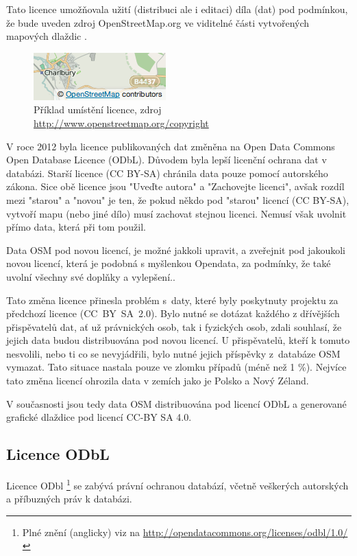 Tato licence umožňovala užití (distribuci ale i editaci) díla (dat) pod podmínkou,
že bude uveden zdroj OpenStreetMap.org ve viditelné části
vytvořených mapových dlaždic \cite{OSMlicence}.

  \begin{figure}[hbt]
    \centering
      \includegraphics[scale=0.75]{./pictures/attribution_example.png}
      \caption{Příklad umístění licence,
                zdroj \url{http://www.openstreetmap.org/copyright}}
      \label{fig:attribution_example}
  \end{figure} 

V roce 2012 byla licence publikovaných dat změněna na Open Data Commons
Open Database Licence (ODbL).
Důvodem byla lepší licenční ochrana dat v databázi. 
Starší licence (CC BY-SA) chránila data pouze pomocí autorského zákona. 
Sice obě licence jsou "Uveďte autora" a "Zachovejte licenci", avšak rozdíl mezi
"starou" a "novou" je ten, že pokud někdo pod "starou" licencí (CC BY-SA),
vytvoří mapu (nebo jiné dílo) musí zachovat stejnou licenci.
Nemusí však uvolnit přímo data, která při tom použil.

Data OSM pod novou licencí, je možné jakkoli upravit,
a zveřejnit pod jakoukoli novou licencí,
která je podobná s myšlenkou Opendata, 
za podmínky, že také uvolní všechny své doplňky a vylepšení.\cite{OSMlicenceChange}.

Tato změna licence přinesla problém
s~daty, které byly poskytnuty projektu za předchozí licence
(CC~BY~SA~2.0). Bylo nutné se dotázat každého z dřívějších
přispěvatelů dat, ať už právnických osob, tak i fyzických osob,
zdali souhlasí, že jejich data budou distribuována pod novou licencí.
U přispěvatelů, kteří k tomuto nesvolili, nebo ti co se nevyjádřili,
bylo nutné jejich příspěvky z~databáze OSM vymazat.
Tato situace nastala pouze ve zlomku případů (méně než 1 \%).
Nejvíce tato změna licencí ohrozila data v zemích jako je Polsko a Nový Zéland. \cite {OSMlicenceIssue}

V současnosti jsou tedy data OSM distribuována pod licencí ODbL a
generované grafické dlaždice pod licencí CC-BY SA 4.0. \cite{OSMlicence}

\subsection{Licence ODbL}
Licence ODbl \footnote{Plné znění (anglicky) viz na \url{http://opendatacommons.org/licenses/odbl/1.0/}}
se zabývá právní ochranou databází, včetně
veškerých autorských a příbuzných práv k databázi.

